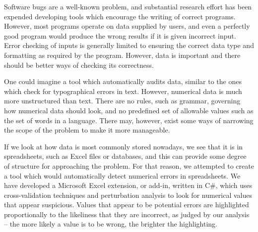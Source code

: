 Software bugs are a well-known problem, and substantial research
effort has been expended developing tools which encourage the writing
of correct programs.  However, most programs operate on data supplied
by users, and even a perfectly good program would produce the wrong
results if it is given incorrect input.  Error checking of inputs is
generally limited to ensuring the correct data type and formatting as
required by the program.  However, data is important and there should
be better ways of checking its correctness.

One could imagine a tool which automatically audits data, similar to
the ones which check for typographical errors in text.  However,
numerical data is much more unstructured than text.  There are no
rules, such as grammar, governing how numerical data should look, and
no predefined set of allowable values such as the set of words in a
language.  There may, however, exist some ways of narrowing the scope
of the problem to make it more manageable.

If we look at how data is most commonly stored nowadays, we see that
it is in spreadsheets, such as Excel files or databases, and this can
provide some degree of structure for approaching the problem.  For
that reason, we attempted to create a tool which would automatically
detect numerical errors in spreadsheets.  We have developed a
Microsoft Excel extension, or add-in, written in C\#, which uses
cross-validation techniques and perturbation analysis to look for
numerical values that appear suspicious.  Values that appear to be
potential errors are highlighted proportionally to the likeliness that
they are incorrect, as judged by our analysis -- the more likely a
value is to be wrong, the brighter the highlighting.
